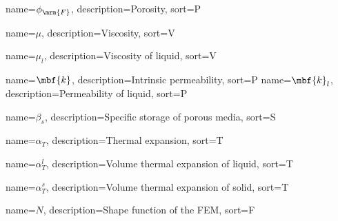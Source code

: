 \newcommand{\poro}{\phi_\mrm{F}}
%
{%
  name={\ensuremath{\phi_\mrm{F}}},
  description={Porosity},
  sort={P}
}

\newcommand{\viscosity}{\mu}
%
{%
  name={\ensuremath{\viscosity}},
  description={Viscosity},
  sort={V}
}

%
{%
  name={\ensuremath{{\viscosity}_l}},
  description={Viscosity of liquid},
  sort={V}
}

\newcommand{\perm}{\mbf{k}}
%
{%
  name={\ensuremath{\perm}},
  description={Intrinsic permeability},
  sort={P}
}
%
{%
  name={\ensuremath{{\perm}_l}},
  description={Permeability of liquid},
  sort={P}
}

%
{%
  name={\ensuremath{{\beta}_s}},
  description={Specific storage of porous media},
  sort={S}
}

\newcommand{\Texpansion}{{\alpha}_T}
%
{%
  name={\ensuremath{{\Texpansion}}},
  description={Thermal expansion},
  sort={T}
}

%
{%
  name={\ensuremath{\Texpansion^l}},
  description={Volume thermal expansion of liquid},
  sort={T}
}

%
{%
  name={\ensuremath{\Texpansion^s}},
  description={Volume thermal expansion of solid},
  sort={T}
}

%
{%
  name={\ensuremath{N}},
  description={Shape function of the FEM},
  sort={F}
}
